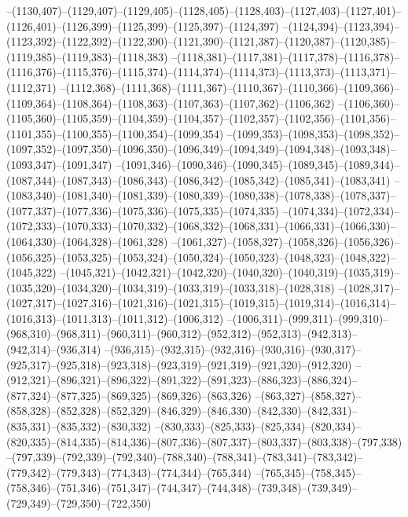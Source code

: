 --(1130,407)--(1129,407)--(1129,405)--(1128,405)--(1128,403)--(1127,403)--(1127,401)--(1126,401)--(1126,399)--(1125,399)--(1125,397)--(1124,397)
--(1124,394)--(1123,394)--(1123,392)--(1122,392)--(1122,390)--(1121,390)--(1121,387)--(1120,387)--(1120,385)--(1119,385)--(1119,383)--(1118,383)
--(1118,381)--(1117,381)--(1117,378)--(1116,378)--(1116,376)--(1115,376)--(1115,374)--(1114,374)--(1114,373)--(1113,373)--(1113,371)--(1112,371)
--(1112,368)--(1111,368)--(1111,367)--(1110,367)--(1110,366)--(1109,366)--(1109,364)--(1108,364)--(1108,363)--(1107,363)--(1107,362)--(1106,362)
--(1106,360)--(1105,360)--(1105,359)--(1104,359)--(1104,357)--(1102,357)--(1102,356)--(1101,356)--(1101,355)--(1100,355)--(1100,354)--(1099,354)
--(1099,353)--(1098,353)--(1098,352)--(1097,352)--(1097,350)--(1096,350)--(1096,349)--(1094,349)--(1094,348)--(1093,348)--(1093,347)--(1091,347)
--(1091,346)--(1090,346)--(1090,345)--(1089,345)--(1089,344)--(1087,344)--(1087,343)--(1086,343)--(1086,342)--(1085,342)--(1085,341)--(1083,341)
--(1083,340)--(1081,340)--(1081,339)--(1080,339)--(1080,338)--(1078,338)--(1078,337)--(1077,337)--(1077,336)--(1075,336)--(1075,335)--(1074,335)
--(1074,334)--(1072,334)--(1072,333)--(1070,333)--(1070,332)--(1068,332)--(1068,331)--(1066,331)--(1066,330)--(1064,330)--(1064,328)--(1061,328)
--(1061,327)--(1058,327)--(1058,326)--(1056,326)--(1056,325)--(1053,325)--(1053,324)--(1050,324)--(1050,323)--(1048,323)--(1048,322)--(1045,322)
--(1045,321)--(1042,321)--(1042,320)--(1040,320)--(1040,319)--(1035,319)--(1035,320)--(1034,320)--(1034,319)--(1033,319)--(1033,318)--(1028,318)
--(1028,317)--(1027,317)--(1027,316)--(1021,316)--(1021,315)--(1019,315)--(1019,314)--(1016,314)--(1016,313)--(1011,313)--(1011,312)--(1006,312)
--(1006,311)--(999,311)--(999,310)--(968,310)--(968,311)--(960,311)--(960,312)--(952,312)--(952,313)--(942,313)--(942,314)--(936,314)
--(936,315)--(932,315)--(932,316)--(930,316)--(930,317)--(925,317)--(925,318)--(923,318)--(923,319)--(921,319)--(921,320)--(912,320)
--(912,321)--(896,321)--(896,322)--(891,322)--(891,323)--(886,323)--(886,324)--(877,324)--(877,325)--(869,325)--(869,326)--(863,326)
--(863,327)--(858,327)--(858,328)--(852,328)--(852,329)--(846,329)--(846,330)--(842,330)--(842,331)--(835,331)--(835,332)--(830,332)
--(830,333)--(825,333)--(825,334)--(820,334)--(820,335)--(814,335)--(814,336)--(807,336)--(807,337)--(803,337)--(803,338)--(797,338)
--(797,339)--(792,339)--(792,340)--(788,340)--(788,341)--(783,341)--(783,342)--(779,342)--(779,343)--(774,343)--(774,344)--(765,344)
--(765,345)--(758,345)--(758,346)--(751,346)--(751,347)--(744,347)--(744,348)--(739,348)--(739,349)--(729,349)--(729,350)--(722,350)
